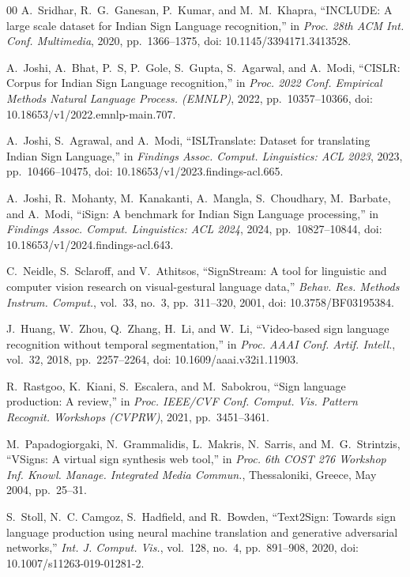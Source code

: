 \documentclass[conference]{IEEEtran}
\begin{document}
\begin{thebibliography}{00}
A.~Sridhar, R.~G.~Ganesan, P.~Kumar, and M.~M.~Khapra, ``INCLUDE: A large scale dataset for Indian Sign Language recognition,'' in \emph{Proc. 28th ACM Int. Conf. Multimedia}, 2020, pp.~1366--1375, doi: 10.1145/3394171.3413528.

A.~Joshi, A.~Bhat, P.~S, P.~Gole, S.~Gupta, S.~Agarwal, and A.~Modi, ``CISLR: Corpus for Indian Sign Language recognition,'' in \emph{Proc. 2022 Conf. Empirical Methods Natural Language Process. (EMNLP)}, 2022, pp.~10357--10366, doi: 10.18653/v1/2022.emnlp-main.707.

A.~Joshi, S.~Agrawal, and A.~Modi, ``ISLTranslate: Dataset for translating Indian Sign Language,'' in \emph{Findings Assoc. Comput. Linguistics: ACL 2023}, 2023, pp.~10466--10475, doi: 10.18653/v1/2023.findings-acl.665.

A.~Joshi, R.~Mohanty, M.~Kanakanti, A.~Mangla, S.~Choudhary, M.~Barbate, and A.~Modi, ``iSign: A benchmark for Indian Sign Language processing,'' in \emph{Findings Assoc. Comput. Linguistics: ACL 2024}, 2024, pp.~10827--10844, doi: 10.18653/v1/2024.findings-acl.643.

C.~Neidle, S.~Sclaroff, and V.~Athitsos, ``SignStream: A tool for linguistic and computer vision research on visual-gestural language data,'' \emph{Behav. Res. Methods Instrum. Comput.}, vol.~33, no.~3, pp.~311--320, 2001, doi: 10.3758/BF03195384.

J.~Huang, W.~Zhou, Q.~Zhang, H.~Li, and W.~Li, ``Video-based sign language recognition without temporal segmentation,'' in \emph{Proc. AAAI Conf. Artif. Intell.}, vol.~32, 2018, pp.~2257--2264, doi: 10.1609/aaai.v32i1.11903.

R.~Rastgoo, K.~Kiani, S.~Escalera, and M.~Sabokrou, ``Sign language production: A review,'' in \emph{Proc. IEEE/CVF Conf. Comput. Vis. Pattern Recognit. Workshops (CVPRW)}, 2021, pp.~3451--3461.

M.~Papadogiorgaki, N.~Grammalidis, L.~Makris, N.~Sarris, and M.~G.~Strintzis, ``VSigns: A virtual sign synthesis web tool,'' in \emph{Proc. 6th COST 276 Workshop Inf. Knowl. Manage. Integrated Media Commun.}, Thessaloniki, Greece, May 2004, pp.~25--31.

S.~Stoll, N.~C. Camgoz, S.~Hadfield, and R.~Bowden, ``Text2Sign: Towards sign language production using neural machine translation and generative adversarial networks,'' \emph{Int. J. Comput. Vis.}, vol.~128, no.~4, pp.~891--908, 2020, doi: 10.1007/s11263-019-01281-2.


\end{thebibliography}
\end{document}
